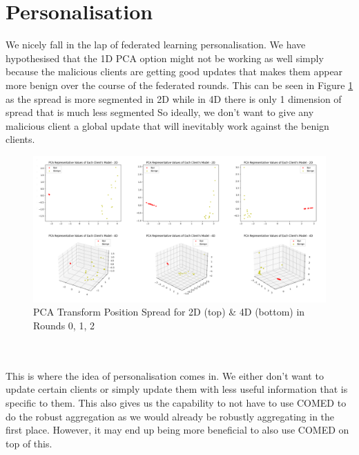 \section{Personalisation}
We nicely fall in the lap of federated learning personalisation.
We have hypothesised that the 1D PCA option might not be working as well simply because the malicious clients are getting good updates that makes them appear more benign over the course of the federated rounds.
This can be seen in Figure \ref{fig:mal_spread} as the spread is more segmented in 2D while in 4D there is only 1 dimension of spread that is much less segmented
So ideally, we don't want to give any malicious client a global update that will inevitably work against the benign clients.
\begin{figure}[htbp]
	\centering
    \includegraphics[scale=0.2]{my_agg/graphs/mal_spread.png}
	\caption{PCA Transform Position Spread for 2D (top) \& 4D (bottom) in Rounds 0, 1, 2}
	\label{fig:mal_spread}
\end{figure}
\\ \\
This is where the idea of personalisation comes in.
We either don't want to update certain clients or simply update them with less useful information that is specific to them.
This also gives us the capability to not have to use COMED to do the robust aggregation as we would already be robustly aggregating in the first place.
However, it may end up being more beneficial to also use COMED on top of this.



